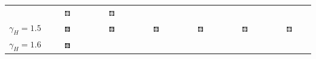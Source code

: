 \begin{tabular}{ T S @{} S @{} S @{} S @{} S @{} S }
  & \includegraphics[width=0.135\textwidth]{../images/girl_6_14}
  & \includegraphics[width=0.135\textwidth]{../images/girl_7_14} \\ [-4pt]
  $\gamma_H=1.5$
  & \includegraphics[width=0.135\textwidth]{../images/girl_2_15}
  & \includegraphics[width=0.135\textwidth]{../images/girl_3_15}
  & \includegraphics[width=0.135\textwidth]{../images/girl_4_15}
  & \includegraphics[width=0.135\textwidth]{../images/girl_5_15}
  & \includegraphics[width=0.135\textwidth]{../images/girl_6_15}
  & \includegraphics[width=0.135\textwidth]{../images/girl_7_15} \\ [-4pt]
  $\gamma_H=1.6$
  & \includegraphics[width=0.135\textwidth]{../images/girl_2_16}

\end{tabular}
